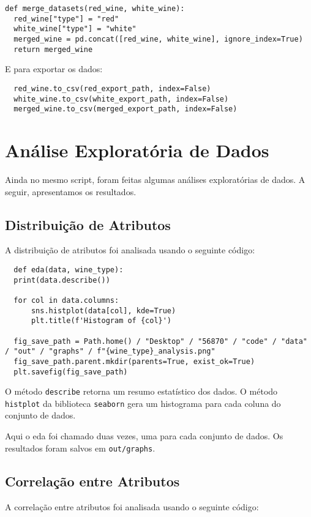 \documentclass{article}
\begin{document}
\begin{verbatim}
def merge_datasets(red_wine, white_wine):
  red_wine["type"] = "red"
  white_wine["type"] = "white"
  merged_wine = pd.concat([red_wine, white_wine], ignore_index=True)
  return merged_wine
\end{verbatim}

E para exportar os dados:

\begin{verbatim}
  red_wine.to_csv(red_export_path, index=False)
  white_wine.to_csv(white_export_path, index=False)
  merged_wine.to_csv(merged_export_path, index=False)
\end{verbatim}

\section{Análise Exploratória de Dados}

Ainda no mesmo script, foram feitas algumas análises exploratórias de dados. A seguir, apresentamos os resultados.

\subsection{Distribuição de Atributos}
A distribuição de atributos foi analisada usando o seguinte código:

\begin{verbatim}
  def eda(data, wine_type):
  print(data.describe())

  for col in data.columns:
      sns.histplot(data[col], kde=True)
      plt.title(f'Histogram of {col}')

  fig_save_path = Path.home() / "Desktop" / "56870" / "code" / "data" / "out" / "graphs" / f"{wine_type}_analysis.png"
  fig_save_path.parent.mkdir(parents=True, exist_ok=True)
  plt.savefig(fig_save_path)
\end{verbatim}

O método \texttt{describe} retorna um resumo estatístico dos dados. O método \texttt{histplot} da biblioteca \texttt{seaborn} gera um histograma para cada coluna do conjunto de dados.

Aqui o eda foi chamado duas vezes, uma para cada conjunto de dados. Os resultados foram salvos em \texttt{out/graphs}.

\subsection{Correlação entre Atributos}
A correlação entre atributos foi analisada usando o seguinte código:
\end{document}
